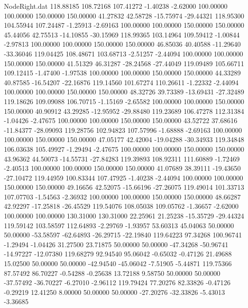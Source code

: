 \begin{filecontents}{NodeRight.dat}
 118.88185  108.72168  107.41272    -1.40238   -2.62000  100.00000  100.00000  150.00000  150.00000   41.27832   42.58728  -15.75974  -29.44321
 118.95300  104.55944  107.24487    -1.25913   -2.69163  100.00000  100.00000  150.00000  150.00000   45.44056   42.75513  -14.10855  -30.15969
 118.99365  103.14964  109.59412    -1.00844   -2.97813  100.00000  100.00000  150.00000  150.00000   46.85036   40.40588  -11.29640  -33.36046
 119.04425  108.48671  103.68713    -2.51257   -2.44094  100.00000  100.00000  150.00000  150.00000   41.51329   46.31287  -28.24568  -27.44049
 119.09489  105.66711  109.12415    -1.47400   -1.97538  100.00000  100.00000  150.00000  150.00000   44.33289   40.87585  -16.54207  -22.16876
 119.14560  101.67274  110.26611    -1.22332   -2.44094  100.00000  100.00000  150.00000  150.00000   48.32726   39.73389  -13.69431  -27.32489
 119.18626  109.09088  106.70715    -1.15169   -2.65582  100.00000  100.00000  150.00000  150.00000   40.90912   43.29285  -12.95952  -29.88480
 119.23689  106.47278  112.31384    -1.04426   -2.47675  100.00000  100.00000  150.00000  150.00000   43.52722   37.68616  -11.84377  -28.09093
 119.28756  102.94823  107.57996    -1.68888   -2.69163  100.00000  100.00000  150.00000  150.00000   47.05177   42.42004  -19.04288  -30.34933
 119.34848  106.03638  105.49927    -1.29494   -2.47675  100.00000  100.00000  150.00000  150.00000   43.96362   44.50073  -14.55731  -27.84283
 119.39893  108.92311  111.60889    -1.72469   -2.40513  100.00000  100.00000  150.00000  150.00000   41.07689   38.39111  -19.43650  -27.10472
 119.44959  100.83344  107.47925    -1.40238   -2.44094  100.00000  100.00000  150.00000  150.00000   49.16656   42.52075  -15.66196  -27.26075
 119.49014  101.33713  107.07703    -1.54563   -2.36932  100.00000  100.00000  150.00000  150.00000   48.66287   42.92297  -17.25818  -26.45529
 119.54076  108.05038  109.05762    -1.36657   -2.62000  100.00000  100.00000  130.31000  130.31000   22.25961   21.25238  -15.35729  -29.44324
 119.59142  103.58597  112.64893    -2.29769   -1.93957   53.60313   45.04063   50.00000   50.00000  -53.58597  -62.64893  -26.29715  -22.19840
 119.64223   97.34268  100.96741    -1.29494   -1.04426   31.27500   23.71875   50.00000   50.00000  -47.34268  -50.96741  -14.97227  -12.07380
 119.68279   92.94540   95.06042    -0.65032   -0.47126   21.49688   15.02500   50.00000   50.00000  -42.94540  -45.06042   -7.51905   -5.44871
 119.75366   87.57492   86.70227    -0.54288   -0.25638   13.72188    9.58750   50.00000   50.00000  -37.57492  -36.70227   -6.27010   -2.96112
 119.79424   77.20276   82.33826    -0.47126   -0.29219   12.41250    8.00000   50.00000   50.00000  -27.20276  -32.33826   -5.43013   -3.36685

\end{filecontents}
